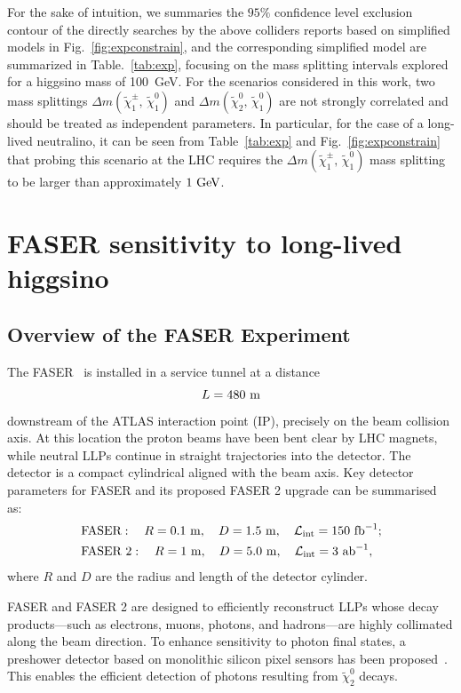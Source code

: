 \documentclass[letterpaper,11pt]{article}
\begin{document}
For the sake of intuition, we summaries the $95\%$ confidence level exclusion contour of the directly searches by the above colliders reports based on simplified models in Fig.~\ref	{fig:expconstrain}, and the corresponding simplified model are summarized in Table.~\ref{tab:exp}, focusing on the mass splitting intervals explored for a higgsino mass of 100~GeV. For the scenarios considered in this work, two mass splittings  $\Delta m(\tilde{\chi}_1^\pm,\,\tilde{\chi}_1^0)$ 
  and $\Delta m(\tilde{\chi}_2^0,\,\tilde{\chi}_1^0)$ are not strongly correlated and should be treated as independent parameters.
In particular, for the case of a long-lived neutralino, it can be seen from Table~\ref{tab:exp} and Fig.~\ref{fig:expconstrain} that probing this scenario at the LHC requires the $\Delta m(\tilde{\chi}_1^\pm,\,\tilde{\chi}_1^0)$ mass splitting to be larger than approximately $1~{\rm GeV}$.


\section{FASER sensitivity to long-lived higgsino}
\label{sec:faser}
\subsection{Overview of the FASER Experiment}
The FASER~\cite{Feng:2022inv, FASER:2018eoc} is installed in a service tunnel at a distance
\begin{equation*}
	L = 480~\rm{m}
\end{equation*}
downstream of the ATLAS interaction point (IP), precisely on the beam collision axis. At this location the proton beams have been bent clear by LHC magnets, while neutral LLPs continue in straight trajectories into the detector.  The detector is a compact cylindrical aligned with the beam axis. Key detector parameters for FASER and its proposed FASER 2 upgrade can be summarised as:
\begin{equation}\begin{split}
	&\text{FASER}: \quad 
	R = 0.1~{\rm m}, \quad
	D = 1.5~{\rm m},\quad
	\mathcal{L}_{\rm int} = 150~{\rm fb}^{-1};  \\
	&\text{FASER 2}: \quad 
	R = 1~{\rm m}, \quad 
	D = 5.0~{\rm m}, \quad
	\mathcal{L}_{\rm int} = 3~{\rm ab}^{-1},
\end{split}\end{equation}
where $R$ and $D$ are the radius and length of the detector cylinder.   
\par FASER and FASER 2 are designed to efficiently reconstruct LLPs whose decay products—such as electrons, muons, photons, and hadrons—are highly collimated along the beam direction. To enhance sensitivity to photon final states, a preshower detector based on monolithic silicon pixel sensors has been proposed~\cite{Boyd:2803084}. This enables the efficient detection of photons resulting from $\tilde{\chi}_2^0$ decays.
\end{document}

